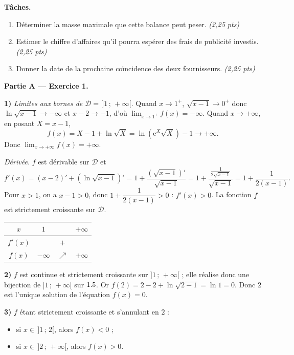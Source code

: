 \noindent\textbf{Tâches.}
\begin{enumerate}[label=\textbf{Tâche \arabic*.},leftmargin=2.4em]
\item Déterminer la masse maximale que cette balance peut peser. \hfill\textit{(2,25 pts)}
\item Estimer le chiffre d'affaires qu'il pourra espérer des frais de publicité investis. \hfill\textit{(2,25 pts)}
\item Donner la date de la prochaine coïncidence des deux fournisseurs. \hfill\textit{(2,25 pts)}
\end{enumerate}


\noindent\textbf{Partie A — Exercice 1.}

\noindent\textbf{1)} \emph{Limites aux bornes de $\mathcal D=\,]1\,;\,+\infty[$.}
Quand $x\to1^+$, $\sqrt{x-1}\to0^+$ donc $\ln\sqrt{x-1}\to-\infty$ et $x-2\to-1$, d'où
$\displaystyle\lim_{x\to1^+}f(x)=-\infty$.
Quand $x\to+\infty$, en posant $X=x-1$,
\[
f(x)=X-1+\ln\sqrt X=\ln\!\left(\mathrm e^{X}\sqrt X\right)-1\longrightarrow+\infty.
\]
Donc $\displaystyle\lim_{x\to+\infty}f(x)=+\infty$.

\noindent\emph{Dérivée.} $f$ est dérivable sur $\mathcal D$ et
\[
f'(x)=(x-2)'+(\ln\sqrt{x-1})'=1+\frac{(\sqrt{x-1})'}{\sqrt{x-1}}=1+\frac{\frac{1}{2\sqrt{x-1}}}{\sqrt{x-1}}=1+\frac1{2(x-1)}.
\]
Pour $x>1$, on a $x-1>0$, donc $1+\dfrac1{2(x-1)}>0$ : $f'(x)>0$. La fonction $f$ est
strictement croissante sur $\mathcal D$.
\begin{center}
\begin{tabular}{c|ccc}
$x$ & $1$ & & $+\infty$\\\hline
$f'(x)$ & & $+$ & \\\hline
$f(x)$ & $-\infty$ & $\nearrow$ & $+\infty$\\
\end{tabular}
\end{center}

\noindent\textbf{2)} $f$ est continue et strictement croissante sur $]1\,;\,+\infty[$ ; elle
réalise donc une bijection de $]1\,;\,+\infty[$ sur $1.5$. Or
$f(2)=2-2+\ln\sqrt{2-1}=\ln1=0$. Donc $2$ est l'unique solution de l'équation $f(x)=0$.

\noindent\textbf{3)} $f$ étant strictement croissante et s'annulant en $2$ :
\begin{itemize}
\item si $x\in\,]1\,;\,2[$, alors $f(x)<0$ ;
\item si $x\in\,]2\,;\,+\infty[$, alors $f(x)>0$.
\end{itemize}

